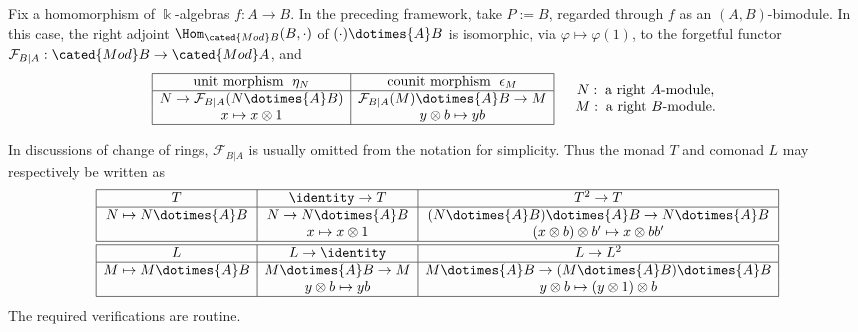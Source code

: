 
\hypertarget{o014.aljabr2.chapter7.morita-theory-b}{ }
\begin{example}\label{eg:comonad-change-ring}
	Fix a homomorphism of $\Bbbk$-algebras $f:A\to B$. In the preceding
	framework, take $P:=B$, regarded through $f$ as an $(A,B)$-bimodule. In
	this case, the right adjoint $\Hom_{\cated{Mod}B}(B,\mathord\cdot)$ of
	$(\mathord\cdot)\dotimes{A}B$ is isomorphic, via
	$\varphi\mapsto\varphi(1)$, to the forgetful functor
	$\mathcal{F}_{B|A}:\cated{Mod}B\to\cated{Mod}A$, and
	\[\begin{array}{|c|c|} \hline
		\text{unit morphism }\; \eta_N & \text{counit morphism }\; \epsilon_M \\ \hline
		N \to \mathcal{F}_{B|A}(N \dotimes{A} B) & \mathcal{F}_{B|A}(M) \dotimes{A} B \to M \\
		x \mapsto x \otimes 1 & y \otimes b \mapsto yb \\ \hline
	\end{array} \quad \begin{array}{c}
		N: \;\text{a right $A$-module,} \\
		M: \;\text{a right $B$-module.}
	\end{array}\]

	In discussions of change of rings, $\mathcal{F}_{B|A}$ is usually omitted
	from the notation for simplicity. Thus the monad $T$ and comonad $L$ may
	respectively be written as
	\[\begin{array}{|c|c|c|} \hline
		T & \identity \to T & T^2 \to T \\ \hline
		N \mapsto N \dotimes{A} B & N \to N \dotimes{A} B & (N \dotimes{A} B) \dotimes{A} B \to N \dotimes{A} B \\
		& x \mapsto x \otimes 1 & (x \otimes b) \otimes b' \mapsto x \otimes bb' \\ \hline\hline
		L & L \to \identity & L \to L^2 \\ \hline
		M \mapsto M \dotimes{A} B & M \dotimes{A} B \to M & M \dotimes{A} B \to (M \dotimes{A} B) \dotimes{A} B \\
		& y \otimes b \mapsto yb & y \otimes b \mapsto (y \otimes 1) \otimes b \\ \hline
	\end{array}\]
	The required verifications are routine.
\end{example}

